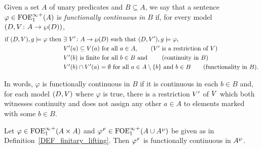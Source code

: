\begin{definition} Given a set $A$ of unary predicates and $B \subseteq A$, we say that a sentence $\varphi \in {\ensuremath{\mathrm{FOE}^{\infty}_1}}^+(A)$ is \emph{functionally continuous in $B$} if, for every model $(D,V \colon A \to \wp(D))$,
\begin{align*}
\text{if } (D,\val),\ass \models \varphi \text{ then } & \exists\ \val' \: A \to \wp(D) \text{ such that } (D, \val'),\ass \models \varphi, \\
& \val'(a)\subseteq \val(a) \text{ for all } a \in A, \tag{$\val'$ is a restriction of $\val$}\\
 & \val'(b) \text{ is finite for all }b \in B \text{ and } \tag{continuity in $B$}\\
 & \val'(b)\cap \val'(a) = \emptyset \text{ for all } a \in A\setminus\{b\} \text{ and }b \in B\tag{functionality in $B$}.
\end{align*}
\end{definition}
In words, $\varphi$ is functionally continuous in $B$ if it is continuous in each $b \in B$ and, for each model $(D,V)$ where $\varphi$ is true, there is a restriction $V'$ of $V$ which both witnesses continuity and does not assign any other $a \in A$ to elements marked with some $b \in B$.
\begin{lemma}\label{LEM_cont}
Let $\varphi \in {\ensuremath{\mathrm{FOE}^{\infty}_1}}^+(A \times A)$ and $\varphi^{{\scriptscriptstyle F}}\in {\ensuremath{\mathrm{FOE}^{\infty}_1}}^+(A\cup A^{\wp} )$ be given as in Definition~\ref{DEF_finitary_lifting}. Then $\varphi^{{\scriptscriptstyle F}}$ is functionally continuous in $A^{\wp}$.
 \end{lemma}

